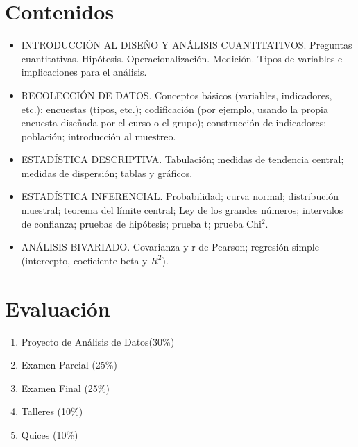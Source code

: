 \documentclass[letterpaper]{article}
\begin{document}
\section{Contenidos}
\begin{itemize}
	
\item	INTRODUCCIÓN AL DISEÑO Y ANÁLISIS CUANTITATIVOS. Preguntas cuantitativas. Hipótesis. Operacionalización. Medición. Tipos de variables e implicaciones para el análisis.
\item	RECOLECCIÓN DE DATOS. Conceptos básicos (variables, indicadores, etc.); encuestas (tipos, etc.); codificación (por ejemplo, usando la propia encuesta diseñada por el curso o el grupo); construcción de indicadores; población; introducción al muestreo.
\item	ESTADÍSTICA DESCRIPTIVA. Tabulación; medidas de tendencia central; medidas de dispersión; tablas y gráficos.
\item	ESTADÍSTICA INFERENCIAL. Probabilidad; curva normal; distribución muestral; teorema del límite central; Ley de los grandes números; intervalos de confianza; pruebas de hipótesis; prueba t; prueba Chi$^2$.  
\item	ANÁLISIS BIVARIADO. Covarianza y r de Pearson; regresión simple (intercepto, coeficiente beta y $R^2$).
\end{itemize}

\section{Evaluación}
\begin{enumerate}
	\item Proyecto de Análisis de Datos(30\%)
\item Examen Parcial (25\%)
\item Examen Final (25\%)
\item Talleres (10\%)
\item Quices (10\%)
\end{enumerate}
\end{document}

